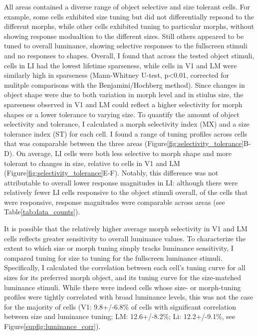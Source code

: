 All areas contained a diverse range of object selective and size tolerant cells. For example, some cells exhibited size tuning but did not differentially repsond to the different morphs, while other cells exhibited tuning to particular morphs, without showing response modualtion to the different sizes. Still others appeared to be tuned to overall luminance, showing selective responses to the fullscreen stimuli and no responses to shapes. Overall, I found that across the tested object stimuli, cells in LI had the lowest lifetime sparseness, while cells in V1 and LM were similarly high in sparseness (Mann-Whitney U-test, p<0.01, corrected for mulitple comparisons with the Benjamini/Hochberg method). Since changes in object shape were due to both variation in morph level and in stiulus size, the sparseness observed in V1 and LM could reflect a higher selectivity for morph shapes or a lower tolerance to varying size. To quantify the amount of object selectivity and tolerance, I calculated a morph selectivity index (MX) and a size tolerance index (ST) for each cell\cite{Zoccolan2007}. I found a range of tuning profiles across cells that was comparable between the three areas (Figure\ref{fig:selectivity_tolerance}B-D). On average, LI cells were both less selective to morph shape and more tolerant to changes in size, relative to cells in V1 and LM (Figure\ref{fig:selectivity_tolerance}E-F). Notably, this difference was not attributable to overall lower response magnitudes in LI: although there were relatively fewer LI cells responsive to the object stimuli overall, of the cells that were responsive, response magnitudes were comparable across areas (see Table\ref{tab:data_counts}).

It is possible that the relatively higher average morph selectivity in V1 and LM cells reflects greater sensitivity to overall luminance values. To characterize the extent to which size or morph tuning simply tracks luminance sensitivity, I compared tuning for size to tuning for the fullscreen luminance stimuli. Specifically, I calculated the correlation between each cell's tuning curve for all sizes for its preferred morph object, and its tuning curve for the size-matched luminance stimuli. While there were indeed cells whose size- or morph-tuning profiles were tightly correlated with broad luminance levels, this was not the case for the majority of cells (V1: 9.8+/-6.8\% of cells with significant correlation between size and luminance tuning; LM: 12.6+/-8.2\%; Li: 12.2+/-9.1\%, see Figure\ref{supfig:luminance_corr}). 

